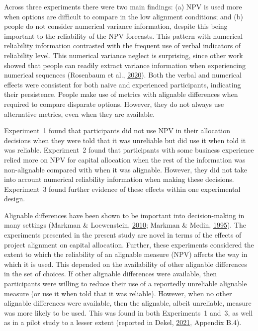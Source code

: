 \documentclass[
  english,
  man, donotrepeattitle,floatsintext]{apa7}
\theoremstyle{definition}
\theoremstyle{definition}
\theoremstyle{definition}
\theoremstyle{definition}
\theoremstyle{remark}
\begin{document}
Across three experiments there were two main findings: (a) NPV is used more when
options are difficult to compare in the low alignment conditions; and (b) people
do not consider numerical variance information, despite this being important to
the reliability of the NPV forecasts. This pattern with numerical reliability
information contrasted with the frequent use of verbal indicators of reliability
level. This numerical variance neglect is surprising, since other work showed
that people can readily extract variance information when experiencing numerical
sequences (Rosenbaum et al., \protect\hyperlink{ref-rosenbaum2020}{2020}). Both the verbal and numerical effects were
consistent for both naive and experienced participants, indicating their
persistence. People make use of metrics with alignable differences when required
to compare disparate options. However, they do not always use alternative
metrics, even when they are available.

Experiment~1 found that participants did not use NPV in their allocation
decisions when they were told that it was unreliable but did use it when told it
was reliable. Experiment~2 found that participants with some business experience
relied more on NPV for capital allocation when the rest of the information was
non-alignable compared with when it was alignable. However, they did not take
into account numerical reliability information when making these decisions.
Experiment~3 found further evidence of these effects within one experimental
design.

Alignable differences have been shown to be important into decision-making in
many settings (Markman \& Loewenstein, \protect\hyperlink{ref-markman2010}{2010}; Markman \& Medin, \protect\hyperlink{ref-markman1995}{1995}). The experiments presented in the
present study are novel in terms of the effects of project alignment on capital
allocation. Further, these experiments considered the extent to which the
reliability of an alignable measure (NPV) affects the way in which it is used.
This depended on the availability of other alignable differences in the set of
choices. If other alignable differences were available, then participants were
willing to reduce their use of a reportedly unreliable alignable measure (or use
it when told that it was reliable). However, when no other alignable differences
were available, then the alignable, albeit unreliable, measure was more likely
to be used. This was found in both Experiments~1 and~3, as well as in a pilot
study to a lesser extent (reported in Dekel, \protect\hyperlink{ref-dekel2021b}{2021}, Appendix B.4).
\end{document}
